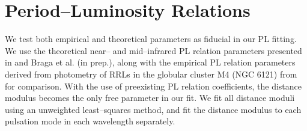 \documentclass[a4paper,fleqn,usenatbib]{mnras}
\begin{document}

\section{Period--Luminosity Relations}
\label{sec:pl_relation}


We test both empirical and theoretical parameters as fiducial in our PL fitting. We use the theoretical near-- and mid--infrared PL relation parameters presented in \citet{2015ApJ...808...50M} and Braga et al. (in prep.), along with the empirical PL relation parameters derived from photometry of RRLs in the globular cluster M4 (NGC 6121) from \citet{2015arXiv150507858N} for comparison. With the use of preexisting PL relation coefficients, the distance modulus becomes the only free parameter in our fit. We fit all distance moduli using an unweighted least--squares method, and fit the distance modulus to each pulsation mode in each wavelength separately.

\end{document}
